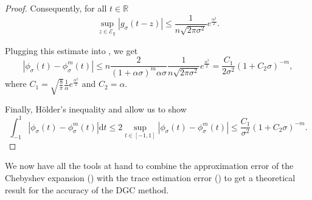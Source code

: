 \begin{proof}
    Consequently, for all $t \in \mathbb{R}$
    \begin{equation}
        \sup_{z \in \mathcal{E}_{\chi}} |g_{\sigma}(t - z)| 
        \leq \frac{1}{n \sqrt{2 \pi \sigma^2}} e^{\frac{\alpha^2}{2}}.
    \end{equation}

    Plugging this estimate into , we get
    \begin{equation}
        \left| \phi_{\sigma}(t) - \phi_{\sigma}^m(t) \right|
        \leq n \frac{2}{(1 + \alpha\sigma)^m\alpha \sigma} \frac{1}{n \sqrt{2 \pi \sigma^2}} e^{\frac{\alpha^2}{2}}
        = \frac{C_1}{2 \sigma^2} (1 + C_2 \sigma)^{-m},
        \label{equ:2-chebyshev-uniform-bound}
    \end{equation}
    where $C_1=\sqrt{\frac{8}{\pi}}\frac{1}{\alpha}e^{\frac{\alpha^2}{2}}$ and $C_2=\alpha$.

    Finally, Hölder's inequality \cite{klenke2013probability} and 
     allow us to show
    \begin{equation}
        \int_{-1}^{1} \left| \phi_{\sigma}(t) - \phi_{\sigma}^m(t) \right| \mathrm{d}t
            \leq 2 \sup_{t \in [-1, 1]} \left| \phi_{\sigma}(t) - \phi_{\sigma}^m(t) \right|
            \leq \frac{C_1}{\sigma^2} (1 + C_2 \sigma)^{-m}.
    \end{equation}
\end{proof}

We now have all the tools at hand to combine the approximation error of the
Chebyshev expansion () with the trace estimation
error () to get a theoretical
result for the accuracy of the \gls{DGC} method.

